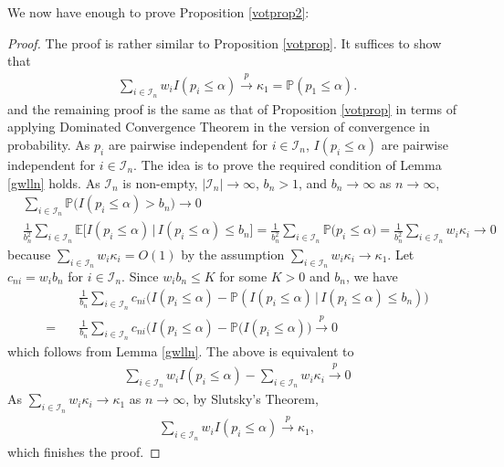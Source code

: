 \documentclass[11pt]{article}
\def\mc#1{\mathcal{#1}} %
\def\E{\mathbb{E}} %
\def\mc#1{\mathcal{#1}}
\def\P{\mathbb{P}}
\def\cp{\overset{p}{\to}}
\theoremstyle{definition}
\begin{document}
We now have enough to prove Proposition \ref{votprop2}:

\begin{proof}
  The proof is rather similar to Proposition \ref{votprop}. It suffices to show that
  \begin{align*}
   \sum_{i\in \mc{I}_n} w_i I(p_i \leq  \alpha) \cp \kappa_1 =  \P(p_1 \leq \alpha).
  \end{align*}
  and the remaining proof is the same as that of Proposition \ref{votprop} in terms of applying Dominated Convergence Theorem in the version of  convergence in probability. As $p_i$ are pairwise independent for $i\in \mc{I}_n$, $I(p_i\leq \alpha)$ are pairwise independent for $i \in \mc{I}_n$. The idea is to prove the required condition of Lemma \ref{gwlln} holds. As  $\mc{I}_n$  is non-empty, $|\mc{I}_n| \to \infty$, $b_n > 1$, and  $b_n \to \infty$ as $n \to \infty$, 
  \begin{align*}
    & \sum_{i\in \mc{I}_n} \P\big( I(p_i \leq  \alpha) > b_n\big) \to 0\\
   & \frac{1}{b_n^2} \sum_{i\in \mc{I}_n} \E\big[ I(p_i \leq  \alpha) \,|\, I(p_i \leq  \alpha) \leq b_n\big]
     =  \frac{1}{b_n^2} \sum_{i\in \mc{I}_n} \P\big(p_i \leq\alpha \big)
     = \frac{1}{b_n^2} \sum_{i\in \mc{I}_n} w_i \kappa_i  \to 0
  \end{align*}
  because $ \sum_{i\in \mc{I}_n} w_i \kappa_i = O(1)$ by the assumption $\sum_{i\in \mc{I}_n} w_i \kappa_i \to \kappa_{1}$. Let $c_{ni} = w_i b_n$ for $i \in \mc{I}_n$. Since $w_i b_n\leq K$ for some $K > 0$ and $b_n$, we have 
  \begin{align*}
    & \frac{1}{b_n} \sum_{i\in \mc{I}_n}  c_{ni} \big(  I(p_i \leq  \alpha) - \P( I(p_i \leq  \alpha) \, |\,  I(p_i \leq  \alpha)  \leq b_n )  \big) \\
  = \quad     &\frac{1}{b_n} \sum_{i\in \mc{I}_n}  c_{ni} \big(  I(p_i \leq  \alpha) - \P( I(p_i \leq  \alpha) \big)  \cp 0
  \end{align*}
  which follows from Lemma \ref{gwlln}. The above is equivalent to
  \begin{align*}
   \sum_{i\in \mc{I}_n}  w_i I(p_i \leq  \alpha) - \sum_{i\in \mc{I}_n} w_i  \kappa_i  \cp 0
  \end{align*}
  As $\sum_{i\in \mc{I}_n} w_i  \kappa_i\to \kappa_1$ as $n \to \infty$, by Slutsky's Theorem,
  \begin{align*}
     \sum_{i\in \mc{I}_n}  w_i I(p_i \leq  \alpha)  \cp \kappa_1,
  \end{align*}
  which finishes the proof.
\end{proof}






%

	
\end{document}
